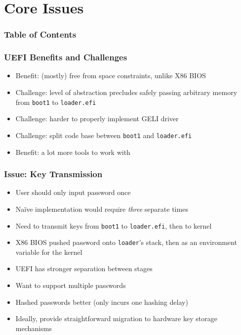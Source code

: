\documentclass{beamer}
\begin{document}
\section{Core Issues}

\begin{frame}
  \frametitle{Table of Contents}
  \tableofcontents[currentsection]
\end{frame}

\begin{frame}
  \frametitle{UEFI Benefits and Challenges}
  \begin{itemize}
  \item Benefit: (mostly) free from space constraints, unlike X86 BIOS
  \item Challenge: level of abstraction precludes safely passing
    arbitrary memory from \texttt{boot1} to \texttt{loader.efi}
  \item Challenge: harder to properly implement GELI driver
  \item Challenge: split code base between \texttt{boot1} and
    \texttt{loader.efi}
  \item Benefit: a lot more tools to work with
  \end{itemize}
\end{frame}

\begin{frame}
  \frametitle{Issue: Key Transmission}
  \begin{itemize}
  \item User should only input password once
  \item Na\"{i}ve implementation would require \emph{three} separate times
  \item Need to transmit keys from \texttt{boot1} to
    \texttt{loader.efi}, then to kernel
  \item X86 BIOS pushed password onto \texttt{loader}'s stack, then as
    an environment variable for the kernel
  \item UEFI has stronger separation between stages
  \item Want to support multiple passwords
  \item Hashed passwords better (only incurs one hashing delay)
  \item Ideally, provide straightforward migration to hardware key
    storage mechanisms
  \end{itemize}
\end{frame}
\end{document}
